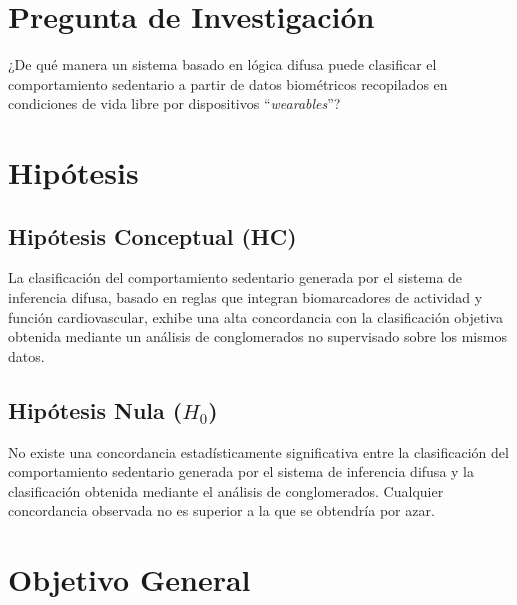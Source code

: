 \section{Pregunta de Investigación}
\label{sec:pregunta_investigacion}

¿De qué manera un sistema basado en lógica difusa puede clasificar el comportamiento sedentario a partir de datos biométricos recopilados en condiciones de vida libre por dispositivos ``\textit{wearables}''?

\section{Hipótesis}
\label{sec:hipotesis}

\subsection{Hipótesis Conceptual (HC)}
\label{subsec:hipotesis_conceptual}

La clasificación del comportamiento sedentario generada por el sistema de inferencia difusa, basado en reglas que integran biomarcadores de actividad y función cardiovascular, exhibe una alta concordancia con la clasificación objetiva obtenida mediante un análisis de conglomerados no supervisado sobre los mismos datos.

\subsection{Hipótesis Nula ($H_0$)}
\label{subsec:hipotesis_nula}

No existe una concordancia estadísticamente significativa entre la clasificación del comportamiento sedentario generada por el sistema de inferencia difusa y la clasificación obtenida mediante el análisis de conglomerados. Cualquier concordancia observada no es superior a la que se obtendría por azar.

\section{Objetivo General}
\label{sec:objetivo_general}

